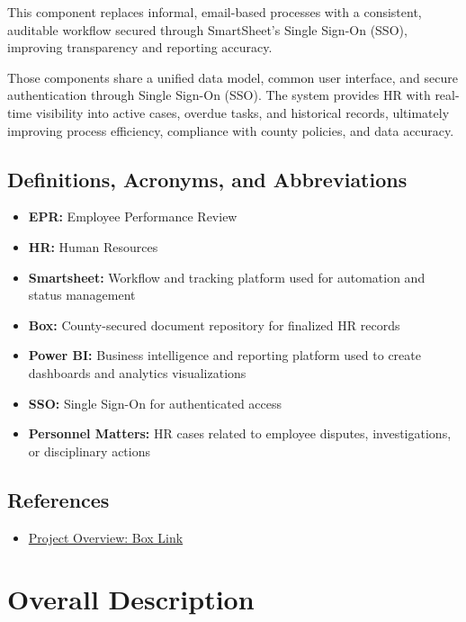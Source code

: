 \documentclass[12pt]{article}
\begin{document}
This component replaces informal, email-based processes with a consistent, auditable workflow secured through SmartSheet's Single Sign-On (SSO), improving transparency and reporting accuracy.


Those components share a unified data model, common user interface, and secure authentication through Single Sign-On (SSO). The system provides HR with real-time visibility into active cases, overdue tasks, and historical records, ultimately improving process efficiency, compliance with county policies, and data accuracy.

\subsection{Definitions, Acronyms, and Abbreviations}

\begin{itemize}
  \item \textbf{EPR:} Employee Performance Review
  \item \textbf{HR:} Human Resources
  \item \textbf{Smartsheet:} Workflow and tracking platform used for automation and status management
  \item \textbf{Box:} County-secured document repository for finalized HR records
  \item \textbf{Power BI:} Business intelligence and reporting platform used to create dashboards and analytics visualizations
  \item \textbf{SSO:} Single Sign-On for authenticated access
  \item \textbf{Personnel Matters:} HR cases related to employee disputes, investigations, or disciplinary actions
\end{itemize}

\subsection{References}

\begin{itemize}
  \item \href{https://cosantabarbara.app.box.com/s/xzxniv8dk6gt2eormc0b8ihsn686cf6l}{Project Overview: Box Link}
\end{itemize}

\section{Overall Description}
\end{document}
